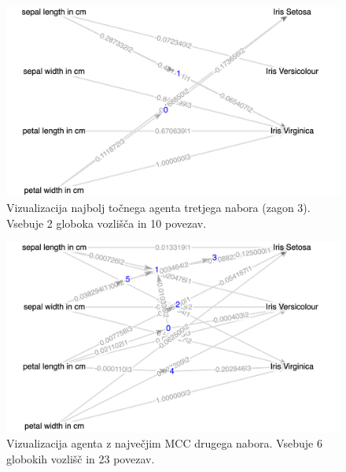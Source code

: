\begin{figure}[H]
    \begin{center}
        \includegraphics[width=13cm]{iris/3/acc_g}
    \end{center}
    \caption{Vizualizacija najbolj točnega agenta tretjega nabora (zagon 3). Vsebuje 2 globoka vozlišča in 10 povezav.}
    \label{fig:iris_acc_3_g}
\end{figure}

\begin{figure}[H]
    \begin{center}
        \includegraphics[width=13cm]{iris/3/mcc_g}
    \end{center}
    \caption{Vizualizacija agenta z največjim MCC drugega nabora. Vsebuje 6 globokih vozlišč in 23 povezav.}
    \label{fig:iris_mcc_3_g}
\end{figure}

